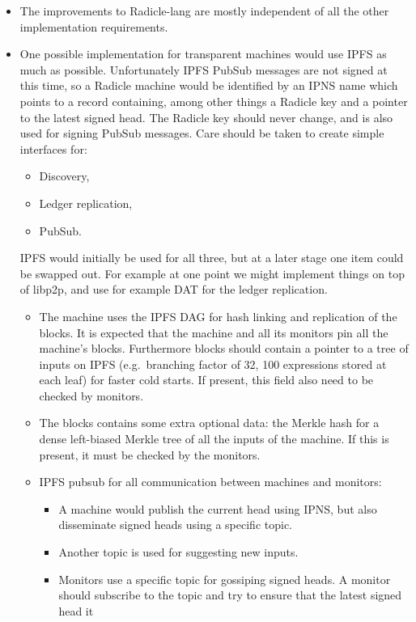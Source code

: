 \documentclass[a4paper, oneside, 10pt]{amsart}
\begin{document}
\begin{itemize}
\item
  The improvements to Radicle-lang are mostly independent of all the other
  implementation requirements.
\item
  One possible implementation for transparent machines would use IPFS as much as
  possible. Unfortunately IPFS PubSub messages are not signed at this time, so a
  Radicle machine would be identified by an IPNS name which points to a record
  containing, among other things a Radicle key and a pointer to the latest
  signed head. The Radicle key should never change, and is also used for signing
  PubSub messages. Care should be taken to create simple interfaces for:
  \begin{itemize}
  \item Discovery,
  \item Ledger replication,
  \item PubSub.
  \end{itemize}
  IPFS would initially be used for all three, but at a later stage one item
  could be swapped out. For example at one point we might implement things on
  top of libp2p, and use for example DAT for the ledger replication.
  \begin{itemize}
  \item
    The machine uses the IPFS DAG for hash linking and replication of the
    blocks. It is expected that the machine and all its monitors pin all the
    machine's blocks. Furthermore blocks should contain a pointer to a tree of
    inputs on IPFS (e.g.~branching factor of 32, 100 expressions stored at each
    leaf) for faster cold starts. If present, this field also need to be checked
    by monitors.
  \item
    The blocks contains some extra optional data: the Merkle hash for a dense
    left-biased Merkle tree of all the inputs of the machine. If this is
    present, it must be checked by the monitors.
  \item
    IPFS pubsub for all communication between machines and monitors:
    \begin{itemize}
    \item
      A machine would publish the current head using IPNS, but also disseminate
      signed heads using a specific topic.
    \item
      Another topic is used for suggesting new inputs.
    \item
      Monitors use a specific topic for gossiping signed heads. A monitor should
      subscribe to the topic and try to ensure that the latest signed head it

\end{itemize}
\end{itemize}
\end{itemize}
\end{document}
